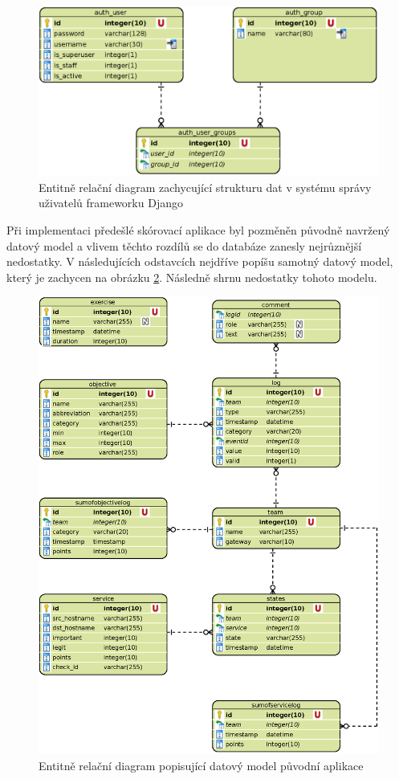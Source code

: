 \documentclass[
  digital, %
  twoside, %
  table,   %
  nolof,     %
  nolot,     %
]{fithesis3}
\begin{document}
\begin{figure}[h!]
    \centering
    \includegraphics[width=13cm]{images/ERD-django.eps}
    \caption{Entitně relační diagram zachycující strukturu dat v systému správy uživatelů frameworku Django}
    \label{fig:erdDjango}
\end{figure}

Při implementaci předešlé skórovací aplikace byl pozměněn původně navržený datový model a vlivem těchto rozdílů se do databáze zanesly nejrůznější nedostatky. V následujících odstavcích nejdříve popíšu samotný datový model, který je zachycen na obrázku \ref{fig:erdOldApp}. Následně shrnu nedostatky tohoto modelu. 

\begin{figure}[h!]
    \centering
    \includegraphics[width=13.5cm]{images/ERD-old-app.eps}
    \caption{Entitně relační diagram popisující datový model původní aplikace}
    \label{fig:erdOldApp}
\end{figure}
\end{document}
